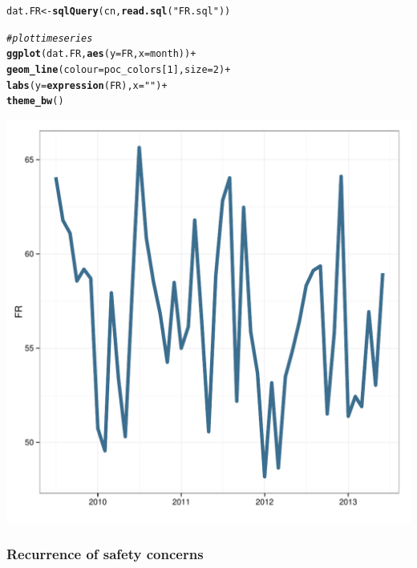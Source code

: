 \documentclass[12pt]{article}\usepackage[]{graphicx}\usepackage[]{color}
\makeatletter
\def\maxwidth{ %
  \ifdim\Gin@nat@width>\linewidth
    \linewidth
  \else
    \Gin@nat@width
  \fi
}
\newcommand{\hlnum}[1]{\textcolor[rgb]{0.686,0.059,0.569}{#1}}%
\newcommand{\hlstr}[1]{\textcolor[rgb]{0.192,0.494,0.8}{#1}}%
\newcommand{\hlcom}[1]{\textcolor[rgb]{0.678,0.584,0.686}{\textit{#1}}}%
\newcommand{\hlopt}[1]{\textcolor[rgb]{0,0,0}{#1}}%
\newcommand{\hlstd}[1]{\textcolor[rgb]{0.345,0.345,0.345}{#1}}%
\newcommand{\hlkwb}[1]{\textcolor[rgb]{0.69,0.353,0.396}{#1}}%
\newcommand{\hlkwc}[1]{\textcolor[rgb]{0.333,0.667,0.333}{#1}}%
\newcommand{\hlkwd}[1]{\textcolor[rgb]{0.737,0.353,0.396}{\textbf{#1}}}%
\newenvironment{kframe}{%
 \def\at@end@of@kframe{}%
 \ifinner\ifhmode%
  \def\at@end@of@kframe{\end{minipage}}%
  \begin{minipage}{\columnwidth}%
 \fi\fi%
 \def\FrameCommand##1{\hskip\@totalleftmargin \hskip-\fboxsep
 \colorbox{shadecolor}{##1}\hskip-\fboxsep
     \hskip-\linewidth \hskip-\@totalleftmargin \hskip\columnwidth}%
 \MakeFramed {\advance\hsize-\width
   \@totalleftmargin\z@ \linewidth\hsize
   \@setminipage}}%
 {\par\unskip\endMakeFramed%
 \at@end@of@kframe}
\newenvironment{knitrout}{}{} %
\makeatother
\begin{document}
\begin{knitrout}
\color{fgcolor}\begin{kframe}
\begin{alltt}
\hlstd{dat.FR} \hlkwb{<-} \hlkwd{sqlQuery}\hlstd{(cn,} \hlkwd{read.sql}\hlstd{(}\hlstr{"FR.sql"}\hlstd{))}

\hlcom{#plot time series}
\hlkwd{ggplot}\hlstd{(dat.FR,} \hlkwd{aes}\hlstd{(}\hlkwc{y}\hlstd{=FR,} \hlkwc{x}\hlstd{=month))} \hlopt{+}
  \hlkwd{geom_line}\hlstd{(}\hlkwc{colour}\hlstd{=poc_colors[}\hlnum{1}\hlstd{],} \hlkwc{size}\hlstd{=}\hlnum{2}\hlstd{)} \hlopt{+}
  \hlkwd{labs}\hlstd{(}\hlkwc{y} \hlstd{=} \hlkwd{expression}\hlstd{(FR),} \hlkwc{x} \hlstd{=} \hlstr{""}\hlstd{)} \hlopt{+}
  \hlkwd{theme_bw}\hlstd{()}
\end{alltt}
\end{kframe}

{\centering \includegraphics[width=\maxwidth]{figure/FR} 

}



\end{knitrout}



\subsubsection{Recurrence of safety concerns}
\end{document}

